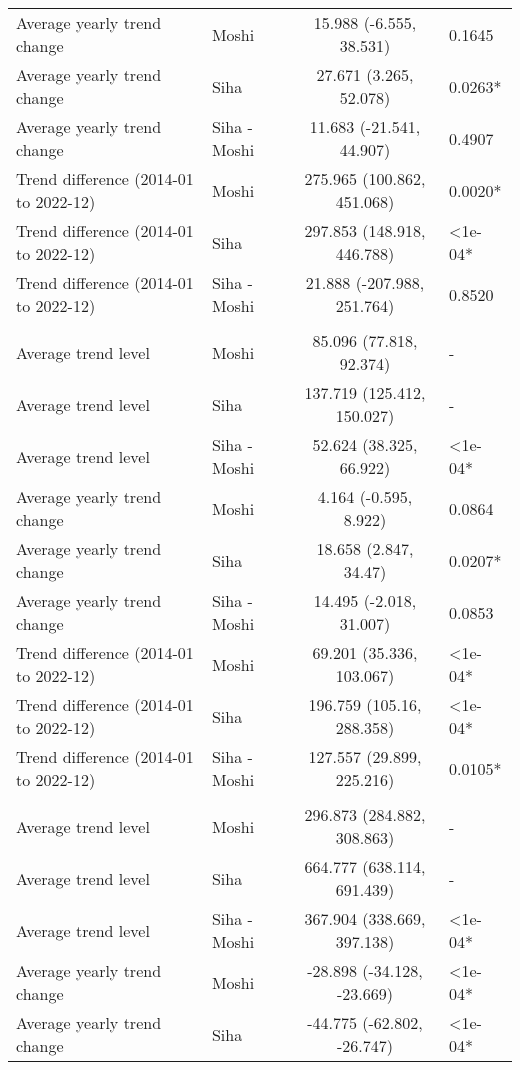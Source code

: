 \begin{longtable}{l|lcl}
Average yearly trend change & Moshi & 15.988 (-6.555, 38.531) & 0.1645 \\ 
Average yearly trend change & Siha & 27.671 (3.265, 52.078) & 0.0263* \\ 
Average yearly trend change & Siha - Moshi & 11.683 (-21.541, 44.907) & 0.4907 \\ 
Trend difference (2014-01 to 2022-12) & Moshi & 275.965 (100.862, 451.068) & 0.0020* \\ 
Trend difference (2014-01 to 2022-12) & Siha & 297.853 (148.918, 446.788) & <1e-04* \\ 
Trend difference (2014-01 to 2022-12) & Siha - Moshi & 21.888 (-207.988, 251.764) & 0.8520 \\ 
\midrule\addlinespace[2.5pt]
\multicolumn{4}{l}{Infectious Eye Disease} \\ 
\midrule\addlinespace[2.5pt]
Average trend level & Moshi & 85.096 (77.818, 92.374) & - \\ 
Average trend level & Siha & 137.719 (125.412, 150.027) & - \\ 
Average trend level & Siha - Moshi & 52.624 (38.325, 66.922) & <1e-04* \\ 
Average yearly trend change & Moshi & 4.164 (-0.595, 8.922) & 0.0864 \\ 
Average yearly trend change & Siha & 18.658 (2.847, 34.47) & 0.0207* \\ 
Average yearly trend change & Siha - Moshi & 14.495 (-2.018, 31.007) & 0.0853 \\ 
Trend difference (2014-01 to 2022-12) & Moshi & 69.201 (35.336, 103.067) & <1e-04* \\ 
Trend difference (2014-01 to 2022-12) & Siha & 196.759 (105.16, 288.358) & <1e-04* \\ 
Trend difference (2014-01 to 2022-12) & Siha - Moshi & 127.557 (29.899, 225.216) & 0.0105* \\ 
\midrule\addlinespace[2.5pt]
\multicolumn{4}{l}{Intestinal Worms} \\ 
\midrule\addlinespace[2.5pt]
Average trend level & Moshi & 296.873 (284.882, 308.863) & - \\ 
Average trend level & Siha & 664.777 (638.114, 691.439) & - \\ 
Average trend level & Siha - Moshi & 367.904 (338.669, 397.138) & <1e-04* \\ 
Average yearly trend change & Moshi & -28.898 (-34.128, -23.669) & <1e-04* \\ 
Average yearly trend change & Siha & -44.775 (-62.802, -26.747) & <1e-04* \\ 

\end{longtable}
